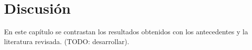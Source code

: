 
\chapter{Discusión}

\label{cap:discusion}

En este capítulo se contrastan los resultados obtenidos con los antecedentes
y la literatura revisada. (TODO: desarrollar).


